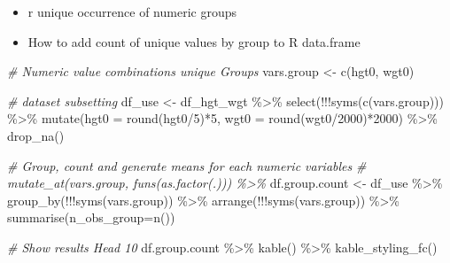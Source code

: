 \documentclass[
]{book}
\newenvironment{Shaded}{\begin{snugshade}}{\end{snugshade}}
\newcommand{\AttributeTok}[1]{\textcolor[rgb]{0.77,0.63,0.00}{#1}}
\newcommand{\CommentTok}[1]{\textcolor[rgb]{0.56,0.35,0.01}{\textit{#1}}}
\newcommand{\DecValTok}[1]{\textcolor[rgb]{0.00,0.00,0.81}{#1}}
\newcommand{\FunctionTok}[1]{\textcolor[rgb]{0.00,0.00,0.00}{#1}}
\newcommand{\NormalTok}[1]{#1}
\newcommand{\OtherTok}[1]{\textcolor[rgb]{0.56,0.35,0.01}{#1}}
\newcommand{\SpecialCharTok}[1]{\textcolor[rgb]{0.00,0.00,0.00}{#1}}
\newcommand{\StringTok}[1]{\textcolor[rgb]{0.31,0.60,0.02}{#1}}
\providecommand{\tightlist}{%
  \setlength{\itemsep}{0pt}\setlength{\parskip}{0pt}}
\begin{document}
\begin{itemize}
\tightlist
\item
  r unique occurrence of numeric groups
\item
  How to add count of unique values by group to R data.frame
\end{itemize}

\begin{Shaded}
\begin{Highlighting}[]
\CommentTok{\# Numeric value combinations unique Groups}
\NormalTok{vars.group }\OtherTok{\textless{}{-}} \FunctionTok{c}\NormalTok{(}\StringTok{\textquotesingle{}hgt0\textquotesingle{}}\NormalTok{, }\StringTok{\textquotesingle{}wgt0\textquotesingle{}}\NormalTok{)}

\CommentTok{\# dataset subsetting}
\NormalTok{df\_use }\OtherTok{\textless{}{-}}\NormalTok{ df\_hgt\_wgt }\SpecialCharTok{\%\textgreater{}\%} \FunctionTok{select}\NormalTok{(}\SpecialCharTok{!!!}\FunctionTok{syms}\NormalTok{(}\FunctionTok{c}\NormalTok{(vars.group))) }\SpecialCharTok{\%\textgreater{}\%}
            \FunctionTok{mutate}\NormalTok{(}\AttributeTok{hgt0 =} \FunctionTok{round}\NormalTok{(hgt0}\SpecialCharTok{/}\DecValTok{5}\NormalTok{)}\SpecialCharTok{*}\DecValTok{5}\NormalTok{, }\AttributeTok{wgt0 =} \FunctionTok{round}\NormalTok{(wgt0}\SpecialCharTok{/}\DecValTok{2000}\NormalTok{)}\SpecialCharTok{*}\DecValTok{2000}\NormalTok{) }\SpecialCharTok{\%\textgreater{}\%}
            \FunctionTok{drop\_na}\NormalTok{()}

\CommentTok{\# Group, count and generate means for each numeric variables}
\CommentTok{\# mutate\_at(vars.group, funs(as.factor(.))) \%\textgreater{}\%}
\NormalTok{df.group.count }\OtherTok{\textless{}{-}}\NormalTok{ df\_use }\SpecialCharTok{\%\textgreater{}\%} \FunctionTok{group\_by}\NormalTok{(}\SpecialCharTok{!!!}\FunctionTok{syms}\NormalTok{(vars.group)) }\SpecialCharTok{\%\textgreater{}\%}
                    \FunctionTok{arrange}\NormalTok{(}\SpecialCharTok{!!!}\FunctionTok{syms}\NormalTok{(vars.group)) }\SpecialCharTok{\%\textgreater{}\%}
                    \FunctionTok{summarise}\NormalTok{(}\AttributeTok{n\_obs\_group=}\FunctionTok{n}\NormalTok{())}

\CommentTok{\# Show results Head 10}
\NormalTok{df.group.count }\SpecialCharTok{\%\textgreater{}\%} \FunctionTok{kable}\NormalTok{() }\SpecialCharTok{\%\textgreater{}\%} \FunctionTok{kable\_styling\_fc}\NormalTok{()}
\end{Highlighting}
\end{Shaded}
\end{document}
